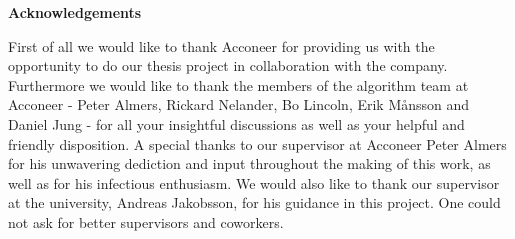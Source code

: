 \newenvironment{acknowledgements}%
    {\cleardoublepage\thispagestyle{empty}\null\vfill\begin{center}%
    \bfseries{\textsf{Acknowledgements}}\end{center}}
    {\vfill\null}
        \begin{acknowledgements}	
	First of all we would like to thank Acconeer for providing us with the opportunity to do our thesis project in collaboration with the company. Furthermore we would like to thank the members of the algorithm team at Acconeer - Peter Almers, Rickard Nelander, Bo Lincoln, Erik Månsson and Daniel Jung - for all your insightful discussions as well as your helpful and friendly disposition. A special thanks to our supervisor at Acconeer Peter Almers for his unwavering dediction and input throughout the making of this work, as well as for his infectious enthusiasm. We would also like to thank our supervisor at the university, Andreas Jakobsson, for his guidance in this project. One could not ask for better supervisors and coworkers.
        \end{acknowledgements}
